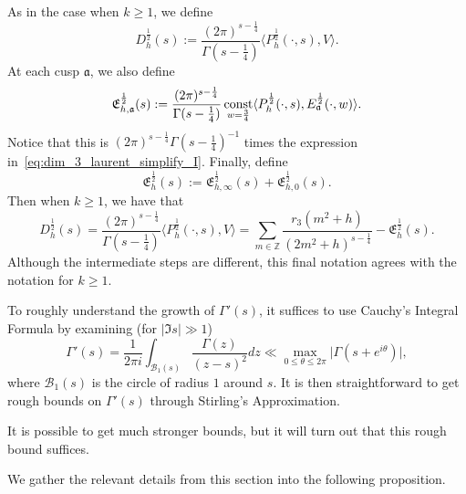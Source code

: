 As in the case when $k \geq 1$, we define
\begin{equation}\label{eq:hyp:Dh_def_half}
  D_h^{\frac{1}{2}}(s) :=
  \frac{(2\pi)^{s - \frac{1}{4}}}{\Gamma(s - \frac{1}{4})}
  \langle P_h^{\frac{1}{2}}(\cdot, s), V \rangle.
\end{equation}
At each cusp $\mathfrak{a}$, we also define
\begin{equation}
  \mathfrak{E}_{h, \mathfrak{a}}^{\frac{1}{2}}(s)
  :=
  \frac{(2\pi)^{s - \frac{1}{4}}}{\Gamma(s - \frac{1}{4})} \operatorname*{const}_{w = \frac{3}{4}}
  \langle P_h^{\frac{1}{2}}(\cdot, s), E_\mathfrak{a}^{\frac{1}{2}}(\cdot, w) \rangle.
\end{equation}
Notice that this is $(2\pi)^{s-\frac{1}{4}} \Gamma(s - \frac{1}{4})^{-1}$ times
the expression in~\eqref{eq:dim_3_laurent_simplify_I}.
Finally, define
\begin{equation}
  \mathfrak{E}_h^{\frac{1}{2}}(s)
  :=
  \mathfrak{E}_{h, \infty}^{\frac{1}{2}}(s) + \mathfrak{E}_{h, 0}^{\frac{1}{2}}(s).
\end{equation}
Then when $k \geq 1$, we have that
\begin{equation}
  D^{\frac{1}{2}}_h(s) = \frac{(2\pi)^{s - \frac{1}{4}}}{\Gamma(s - \frac{1}{4})}
  \langle P_h^{\frac{1}{2}}(\cdot, s), V\rangle
  =
  \sum_{m \in \mathbb{Z}}
  \frac{r_{3}(m^2 + h)}{(2m^2 + h)^{s - \frac{1}{4}}}
  -
  \mathfrak{E}_h^{\frac{1}{2}}(s).
\end{equation}
Although the intermediate steps are different, this final notation agrees with the
notation for $k \geq 1$.



To roughly understand the growth of $\Gamma'(s)$, it suffices to use Cauchy's
Integral Formula by examining (for $\lvert \Im s \rvert \gg 1$)
\begin{equation}
  \Gamma'(s) = \frac{1}{2\pi i} \int_{\mathcal{B}_1(s)} \frac{\Gamma(z)}{(z - s)^2}dz \ll
  \max_{0 \leq \theta \leq 2\pi} \lvert \Gamma(s + e^{i \theta}) \rvert,
\end{equation}
where $\mathcal{B}_1(s)$ is the circle of radius $1$ around $s$.
It is then straightforward to get rough bounds on $\Gamma'(s)$ through
Stirling's Approximation.


\begin{remark}
  It is possible to get much stronger bounds, but it will turn out that this
  rough bound suffices.
\end{remark}


We gather the relevant details from this section into the following proposition.


